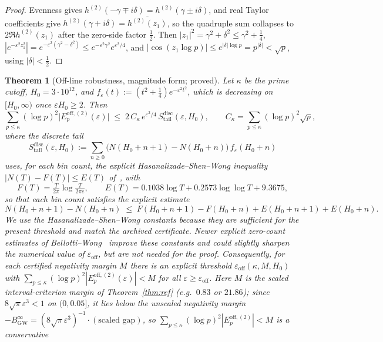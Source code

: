 \documentclass[11pt]{article}
\newtheorem{theorem}{Theorem}[section]
\newcommand{\BinfGW}{B_{\mathrm{GW}}^{\infty}}   %
\newcommand{\Eoff}{E_p^{\mathrm{off},(2)}}  %
\begin{document}
\begin{proof}
Evenness gives $h^{(2)}(-\gamma\mp i\delta)=h^{(2)}(\gamma\pm i\delta)$, and
real Taylor coefficients give
$h^{(2)}(\gamma+i\delta)=\overline{h^{(2)}(z_1)}$, so the quadruple sum
collapses to $2\Re h^{(2)}(z_1)$ after the zero-side factor $\tfrac12$.
Then $|z_1|^2=\gamma^2+\delta^2\le\gamma^2+\tfrac14$,
$|e^{-\varepsilon^2 z_1^2}|=e^{-\varepsilon^2(\gamma^2-\delta^2)}
\le e^{-\varepsilon^2\gamma^2}e^{\varepsilon^2/4}$, and
$|\cos(z_1\log p)|\le e^{|\delta|\log p}=p^{|\delta|}<\sqrt p$, using
$|\delta|<\tfrac12$.
\end{proof}

\begin{theorem}[Off-line robustness, magnitude form; proved]
\label{thm:offline}
Let $\kappa$ be the prime cutoff, $H_0=3\cdot10^{12}$, and
$f_\varepsilon(t):=(t^2+\tfrac14)e^{-\varepsilon^2 t^2}$, which is decreasing
on $[H_0,\infty)$ once $\varepsilon H_0\ge 2$. Then
\[
\sum_{p\le\kappa}(\log p)^2\bigl|\Eoff(\varepsilon)\bigr|
 \;\le\; 2\,C_\kappa\,e^{\varepsilon^2/4}\,
 S_{\mathrm{tail}}^{\mathrm{disc}}(\varepsilon,H_0),
\qquad
C_\kappa=\sum_{p\le\kappa}(\log p)^2\sqrt p,
\]
where the discrete tail
\[
S_{\mathrm{tail}}^{\mathrm{disc}}(\varepsilon,H_0)
 :=\sum_{n\ge 0}\bigl(N(H_0+n+1)-N(H_0+n)\bigr)\,f_\varepsilon(H_0+n)
\]
uses, for each bin count, the explicit Hasanalizade--Shen--Wong inequality
$|N(T)-F(T)|\le E(T)$ of~\cite{HasanalizadeShenWong21}, with
\[
F(T)=\tfrac{T}{2\pi}\log\tfrac{T}{2\pi e},
\qquad
E(T)=0.1038\log T+0.2573\log\log T+9.3675,
\]
so that each bin count satisfies the explicit estimate
\[
N(H_0+n+1)-N(H_0+n)\;\le\;F(H_0+n+1)-F(H_0+n)+E(H_0+n+1)+E(H_0+n).
\]
We use the Hasanalizade--Shen--Wong constants because they are sufficient for
the present threshold and match the archived certificate. Newer explicit
zero-count estimates of Bellotti--Wong~\cite{BellottiWong} improve these
constants and could slightly sharpen the numerical value of
$\varepsilon_{\mathrm{off}}$, but are not needed for the proof.
Consequently, for each certified negativity margin $M$ there is an explicit
threshold $\varepsilon_{\mathrm{off}}(\kappa,M,H_0)$ with
$\sum_{p\le\kappa}(\log p)^2|\Eoff(\varepsilon)|<M$ for all
$\varepsilon\ge\varepsilon_{\mathrm{off}}$.
Here $M$ is the \emph{scaled} interval-criterion margin of
Theorem~\ref{thm:ref} (e.g.\ $0.83$ or $21.86$); since
$8\sqrt\pi\varepsilon^3<1$ on $(0,0.05]$, it lies below the unscaled
negativity margin $-\BinfGW=(8\sqrt\pi\varepsilon^3)^{-1}\cdot(\text{scaled
gap})$, so $\sum_{p\le\kappa}(\log p)^2|\Eoff|<M$ is a conservative

\end{theorem}
\end{document}
